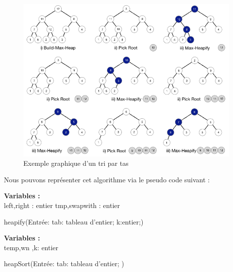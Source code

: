 \begin{figure}[H]
    \centering
        \includegraphics[scale=0.5]{ressources/HEAP.png}
        \caption{Exemple graphique d’un tri par tas}
    \label{fig:insert}
\end{figure}
Nous pouvons  représenter cet algorithme via le pseudo code suivant :
\par
\begin{function}[H]
    \textbf{Variables :}\\
    left,right : entier\;
    tmp,swapwith : entier\;
    
    
    \caption{heapify(Entrée: tab: tableau d'entier; k:entier;)}
\end{function}
\par
\begin{function}[H]
    \textbf{Variables :}\\
     temp,wn ,k: entier\;
    
    
    \caption{heapSort(Entrée: tab: tableau d'entier; )}
\end{function}
